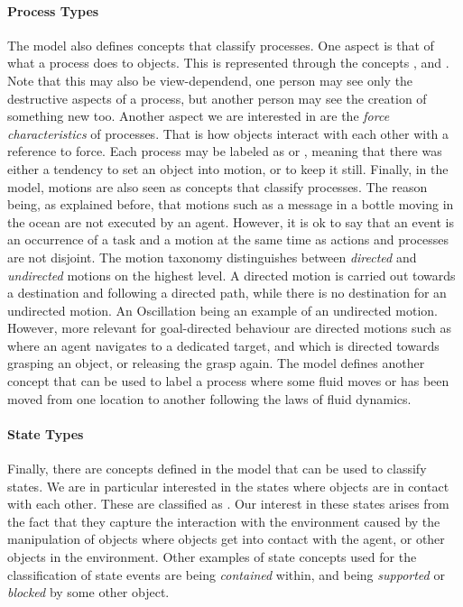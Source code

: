 \paragraph{Process Types}
The \neem model also defines concepts that classify processes.
One aspect is that of what a process does to objects.
This is represented through the concepts ,  and .
Note that this may also be view-dependend, one person may see only the destructive aspects of a process, but another person may see the creation of something new too.
Another aspect we are interested in are the \emph{force characteristics} of processes.
That is how objects interact with each other with a reference to force.
Each process may be labeled as  or , meaning that there was either a tendency to set an object into motion, or to keep it still.
Finally, in the \neem model, motions are also seen as concepts that classify processes.
The reason being, as explained before, that motions such as a message in a bottle moving in the ocean are not executed by an agent.
However, it is ok to say that an event is an occurrence of a task and a motion at the same time as actions and processes are not disjoint.
The motion taxonomy distinguishes between \emph{directed} and \emph{undirected} motions on the highest level.
A directed motion is carried out towards a destination and following a directed path, while there is no destination for an undirected motion.
An Oscillation being an example of an undirected motion.
However, more relevant for goal-directed behaviour are directed motions such as  where an agent navigates to a dedicated target, and  which is directed towards grasping an object, or releasing the grasp again.
The \neem model defines another concept  that can be used to label a process where some fluid moves or has been moved from one location to another following the laws of fluid dynamics.

\paragraph{State Types}
Finally, there are concepts defined in the \neem model that can be used to classify states.
We are in particular interested in the states where objects are in contact with each other.
These are classified as .
Our interest in these states arises from the fact that they capture the interaction with the environment caused by the manipulation of objects where objects get into contact with the agent, or other objects in the environment.
Other examples of state concepts used for the classification of state events are being \emph{contained} within, and being \emph{supported} or \emph{blocked} by some other object.

